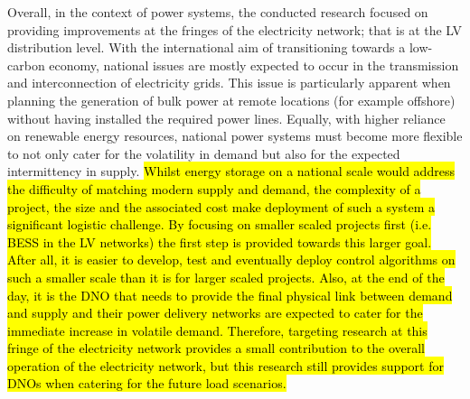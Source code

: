 Overall, in the context of power systems, the conducted research focused on providing improvements at the fringes of the electricity network; that is at the LV distribution level.
With the international aim of transitioning towards a low-carbon economy, national issues are mostly expected to occur in the transmission and interconnection of electricity grids.
This issue is particularly apparent when planning the generation of bulk power at remote locations (for example offshore) without having installed the required power lines.
Equally, with higher reliance on renewable energy resources, national power systems must become more flexible to not only cater for the volatility in demand but also for the expected intermittency in supply.
\hl{Whilst energy storage on a national scale would address the difficulty of matching modern supply and demand, the complexity of a project, the size and the associated cost make deployment of such a system a significant logistic challenge.
By focusing on smaller scaled projects first (i.e. BESS in the LV networks) the first step is provided towards this larger goal.
After all, it is easier to develop, test and eventually deploy control algorithms on such a smaller scale than it is for larger scaled projects.
Also, at the end of the day, it is the DNO that needs to provide the final physical link between demand and supply and their power delivery networks are expected to cater for the immediate increase in volatile demand.
Therefore, targeting research at this fringe of the electricity network provides a small contribution to the overall operation of the electricity network, but this research still provides support for DNOs when catering for the future load scenarios.}
